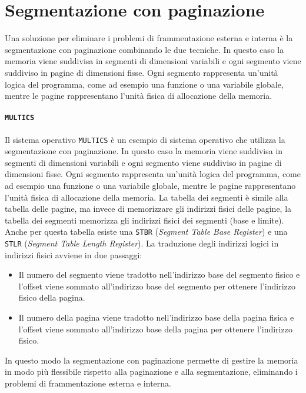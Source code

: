 \section{Segmentazione con paginazione}
    Una soluzione per eliminare i problemi di frammentazione esterna e interna è la segmentazione con paginazione combinando le due tecniche. In questo caso la memoria viene suddivisa in segmenti di dimensioni variabili e ogni segmento viene suddiviso in pagine di dimensioni fisse. Ogni segmento rappresenta un'unità logica del programma, come ad esempio una funzione o una variabile globale, mentre le pagine rappresentano l'unità fisica di allocazione della memoria.
    \paragraph{\texttt{MULTICS}}
        Il sistema operativo \texttt{MULTICS} è un esempio di sistema operativo che utilizza la segmentazione con paginazione. In questo caso la memoria viene suddivisa in segmenti di dimensioni variabili e ogni segmento viene suddiviso in pagine di dimensioni fisse. Ogni segmento rappresenta un'unità logica del programma, come ad esempio una funzione o una variabile globale, mentre le pagine rappresentano l'unità fisica di allocazione della memoria. La tabella dei segmenti è simile alla tabella delle pagine, ma invece di memorizzare gli indirizzi fisici delle pagine, la tabella dei segmenti memorizza gli indirizzi fisici dei segmenti (base e limite). Anche per questa tabella esiste una \texttt{STBR} (\textit{Segment Table Base Register}) e una \texttt{STLR} (\textit{Segment Table Length Register}).\newline
        La traduzione degli indirizzi logici in indirizzi fisici avviene in due passaggi:
        \begin{itemize}
            \item Il numero del segmento viene tradotto nell'indirizzo base del segmento fisico e l'offset viene sommato all'indirizzo base del segmento per ottenere l'indirizzo fisico della pagina.
            \item Il numero della pagina viene tradotto nell'indirizzo base della pagina fisica e l'offset viene sommato all'indirizzo base della pagina per ottenere l'indirizzo fisico.
        \end{itemize}
        In questo modo la segmentazione con paginazione permette di gestire la memoria in modo più flessibile rispetto alla paginazione e alla segmentazione, eliminando i problemi di frammentazione esterna e interna.
